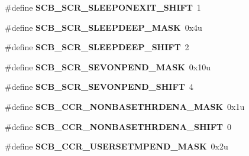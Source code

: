 \begin{DoxyCompactItemize}
\item 
\hypertarget{group___s_c_b___register___masks_gafc63d56cb8407238a9abe5ad54a00809}{}\#define {\bfseries S\+C\+B\+\_\+\+S\+C\+R\+\_\+\+S\+L\+E\+E\+P\+O\+N\+E\+X\+I\+T\+\_\+\+S\+H\+I\+F\+T}~1\label{group___s_c_b___register___masks_gafc63d56cb8407238a9abe5ad54a00809}

\item 
\hypertarget{group___s_c_b___register___masks_ga60307c79f9fb0f1b5b4afe848166f3cf}{}\#define {\bfseries S\+C\+B\+\_\+\+S\+C\+R\+\_\+\+S\+L\+E\+E\+P\+D\+E\+E\+P\+\_\+\+M\+A\+S\+K}~0x4u\label{group___s_c_b___register___masks_ga60307c79f9fb0f1b5b4afe848166f3cf}

\item 
\hypertarget{group___s_c_b___register___masks_ga43cddab3431812a4cdf202bf359506da}{}\#define {\bfseries S\+C\+B\+\_\+\+S\+C\+R\+\_\+\+S\+L\+E\+E\+P\+D\+E\+E\+P\+\_\+\+S\+H\+I\+F\+T}~2\label{group___s_c_b___register___masks_ga43cddab3431812a4cdf202bf359506da}

\item 
\hypertarget{group___s_c_b___register___masks_ga6603e0e99280ae6a73d7ddf1d38075f5}{}\#define {\bfseries S\+C\+B\+\_\+\+S\+C\+R\+\_\+\+S\+E\+V\+O\+N\+P\+E\+N\+D\+\_\+\+M\+A\+S\+K}~0x10u\label{group___s_c_b___register___masks_ga6603e0e99280ae6a73d7ddf1d38075f5}

\item 
\hypertarget{group___s_c_b___register___masks_ga61abde1285bfce2342c1e93a1ecd3166}{}\#define {\bfseries S\+C\+B\+\_\+\+S\+C\+R\+\_\+\+S\+E\+V\+O\+N\+P\+E\+N\+D\+\_\+\+S\+H\+I\+F\+T}~4\label{group___s_c_b___register___masks_ga61abde1285bfce2342c1e93a1ecd3166}

\item 
\hypertarget{group___s_c_b___register___masks_ga363d47714bf931e91353320a934f0a4f}{}\#define {\bfseries S\+C\+B\+\_\+\+C\+C\+R\+\_\+\+N\+O\+N\+B\+A\+S\+E\+T\+H\+R\+D\+E\+N\+A\+\_\+\+M\+A\+S\+K}~0x1u\label{group___s_c_b___register___masks_ga363d47714bf931e91353320a934f0a4f}

\item 
\hypertarget{group___s_c_b___register___masks_ga5607f23f3a48ce3c3741daa85bcdc6c4}{}\#define {\bfseries S\+C\+B\+\_\+\+C\+C\+R\+\_\+\+N\+O\+N\+B\+A\+S\+E\+T\+H\+R\+D\+E\+N\+A\+\_\+\+S\+H\+I\+F\+T}~0\label{group___s_c_b___register___masks_ga5607f23f3a48ce3c3741daa85bcdc6c4}

\item 
\hypertarget{group___s_c_b___register___masks_ga99dd2993e940139f00ef3f27a76c994a}{}\#define {\bfseries S\+C\+B\+\_\+\+C\+C\+R\+\_\+\+U\+S\+E\+R\+S\+E\+T\+M\+P\+E\+N\+D\+\_\+\+M\+A\+S\+K}~0x2u\label{group___s_c_b___register___masks_ga99dd2993e940139f00ef3f27a76c994a}


\end{DoxyCompactItemize}
